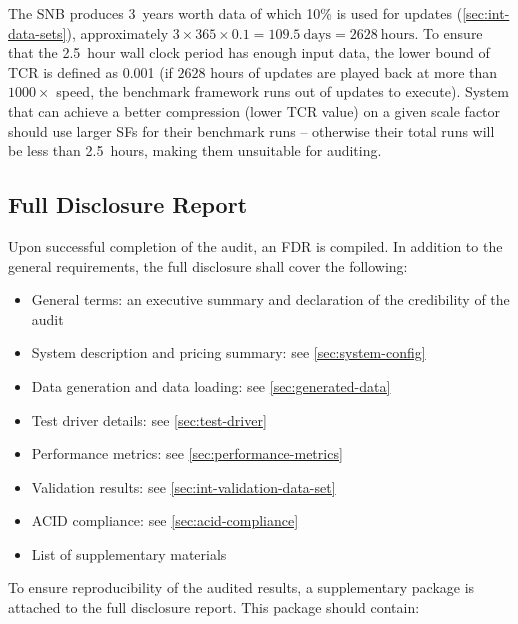 The SNB \datagen produces 3~years worth data of which 10\% is used for updates (\autoref{sec:int-data-sets}), \ie approximately $3 \times 365 \times 0.1 = 109.5~\text{days} = 2628~\text{hours}$.
To ensure that the 2.5~hour wall clock period has enough input data, the lower bound of TCR is defined as 0.001 (if $2628$ hours of updates are played back at more than $1000\times$ speed, the benchmark framework runs out of updates to execute). System that can achieve a better compression (\ie lower TCR value) on a given scale factor should use larger SFs for their benchmark runs -- otherwise their total runs will be less than 2.5~hours, making them unsuitable for auditing.


\subsection{Full Disclosure Report}
\label{sec:int-fdr}

Upon successful completion of the audit, an FDR is compiled. In addition to the general requirements, the full disclosure shall cover the following:

\begin{itemize}
    \item General terms: an executive summary and declaration of the credibility of the audit
    \item System description and pricing summary: see \autoref{sec:system-config}
    \item Data generation and data loading: see \autoref{sec:generated-data}
    \item Test driver details: see \autoref{sec:test-driver}
    \item Performance metrics: see \autoref{sec:performance-metrics}
    \item Validation results: see \autoref{sec:int-validation-data-set}
    \item ACID compliance: see \autoref{sec:acid-compliance}
    \item List of supplementary materials
\end{itemize}

To ensure reproducibility of the audited results, a supplementary package is attached to the full disclosure report. This package should contain:

